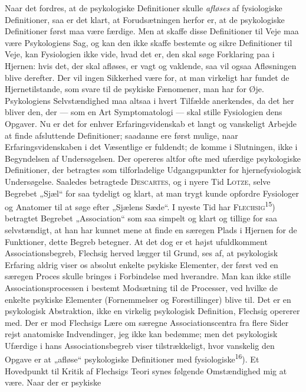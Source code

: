 \documentclass[12pt,a4paper,openany]{book}
\newcommand{\opage}[1]{\marginnote{\footnotesize\textit{[#1]}}}
\begin{document}
Naar det fordres, at de psykologiske Definitioner skulle \textit{afløses} af
fysiologiske Definitioner, saa er det klart, at Forudsætningen herfor er, at de
psykologiske Definitioner først maa være færdige. Men at skaffe disse
Definitioner til Veje maa være Psykologiens Sag, og kan den ikke skaffe
bestemte og sikre Definitioner til Veje, kan Fysiologien ikke vide, hvad det
er, den skal søge Forklaring paa i Hjernen: hvis det, der skal afløses, er vagt
og vaklende, saa vil ogsaa Afløsningen blive derefter. Der vil ingen Sikkerhed
være for, at man virkeligt har fundet de Hjernetilstande, som svare til de
psykiske Fænomener, man har for Øje. Psykologiens Selvstændighed maa altsaa i
hvert Tilfælde anerkendes, da det her bliver den, der --- som en Art
Symptomatologi --- skal stille Fysiologien dens Opgaver. Nu er det for enhver
Erfaringsvidenskab et langt og vanskeligt Arbejde at finde afsluttende
Definitioner; saadanne ere først mulige, naar Erfaringsvidenskaben i det
Væsentlige er fuldendt; de komme i Slutningen, ikke i Begyndelsen af
Undersøgelsen. Der opereres altfor ofte med ufærdige psykologiske Definitioner,
der betragtes som tilforladelige Udgangspunkter for hjernefysiologisk
Undersøgelse. Saaledes betragtede \textsc{Descartes}, og i nyere Tid
\textsc{Lotze}, selve Begrebet „Sjæl“ for saa tydeligt og klart, at man trygt
kunde opfordre Fysiologer og Anatomer til at søge efter „Sjælens Sæde“. I
nyeste Tid har \textsc{Flechsig}\textsuperscript{15}) betragtet Begrebet
„Association“ som saa simpelt og klart og tillige for saa selvstændigt, at han
har kunnet mene at finde en særegen Plads i Hjernen for de Funktioner, dette
Begreb betegner. At det dog er et højst ufuldkomment Associationsbegreb,
Flechsig herved lægger til Grund, ses af, at psykologisk Erfaring aldrig viser
os absolut enkelte psykiske Elementer, der først ved en særegen Proces skulle
bringes i Forbindelse med hverandre. Man kan ikke stille Associationsprocessen
i bestemt Modsætning til de Processer, ved hvilke de enkelte psykiske Elementer
(Fornemmelser og Forestillinger) blive til.
\opage{17}Det er en psykologisk Abstraktion, ikke en virkelig psykologisk
Definition, Flechsig opererer med. Der er mod Flechsigs Lære om særegne
Associationscentra fra flere Sider rejst anatomiske Indvendinger, jeg ikke kan
bedømme; men det psykologisk Ufærdige i hans Associationsbegreb viser
tilstrækkeligt, hvor vanskelig den Opgave er at „afløse“ psykologiske
Definitioner med fysiologiske\textsuperscript{16}). Et Hovedpunkt til Kritik af
Flechsigs Teori synes følgende Omstændighed mig at være. Naar der er psykiske
\end{document}
